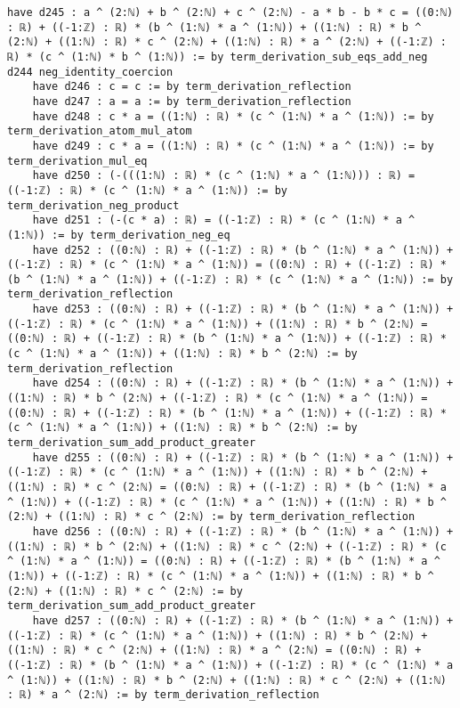 \documentclass{article}
\begin{document}
\begin{tcolorbox}[colback=white!10, width=\linewidth]
\begin{lstlisting}[language=Lean4]
    have d245 : a ^ (2:ℕ) + b ^ (2:ℕ) + c ^ (2:ℕ) - a * b - b * c = ((0:ℕ) : ℝ) + ((-1:ℤ) : ℝ) * (b ^ (1:ℕ) * a ^ (1:ℕ)) + ((1:ℕ) : ℝ) * b ^ (2:ℕ) + ((1:ℕ) : ℝ) * c ^ (2:ℕ) + ((1:ℕ) : ℝ) * a ^ (2:ℕ) + ((-1:ℤ) : ℝ) * (c ^ (1:ℕ) * b ^ (1:ℕ)) := by term_derivation_sub_eqs_add_neg d244 neg_identity_coercion
    have d246 : c = c := by term_derivation_reflection
    have d247 : a = a := by term_derivation_reflection
    have d248 : c * a = ((1:ℕ) : ℝ) * (c ^ (1:ℕ) * a ^ (1:ℕ)) := by term_derivation_atom_mul_atom
    have d249 : c * a = ((1:ℕ) : ℝ) * (c ^ (1:ℕ) * a ^ (1:ℕ)) := by term_derivation_mul_eq
    have d250 : (-(((1:ℕ) : ℝ) * (c ^ (1:ℕ) * a ^ (1:ℕ))) : ℝ) = ((-1:ℤ) : ℝ) * (c ^ (1:ℕ) * a ^ (1:ℕ)) := by term_derivation_neg_product
    have d251 : (-(c * a) : ℝ) = ((-1:ℤ) : ℝ) * (c ^ (1:ℕ) * a ^ (1:ℕ)) := by term_derivation_neg_eq
    have d252 : ((0:ℕ) : ℝ) + ((-1:ℤ) : ℝ) * (b ^ (1:ℕ) * a ^ (1:ℕ)) + ((-1:ℤ) : ℝ) * (c ^ (1:ℕ) * a ^ (1:ℕ)) = ((0:ℕ) : ℝ) + ((-1:ℤ) : ℝ) * (b ^ (1:ℕ) * a ^ (1:ℕ)) + ((-1:ℤ) : ℝ) * (c ^ (1:ℕ) * a ^ (1:ℕ)) := by term_derivation_reflection
    have d253 : ((0:ℕ) : ℝ) + ((-1:ℤ) : ℝ) * (b ^ (1:ℕ) * a ^ (1:ℕ)) + ((-1:ℤ) : ℝ) * (c ^ (1:ℕ) * a ^ (1:ℕ)) + ((1:ℕ) : ℝ) * b ^ (2:ℕ) = ((0:ℕ) : ℝ) + ((-1:ℤ) : ℝ) * (b ^ (1:ℕ) * a ^ (1:ℕ)) + ((-1:ℤ) : ℝ) * (c ^ (1:ℕ) * a ^ (1:ℕ)) + ((1:ℕ) : ℝ) * b ^ (2:ℕ) := by term_derivation_reflection
    have d254 : ((0:ℕ) : ℝ) + ((-1:ℤ) : ℝ) * (b ^ (1:ℕ) * a ^ (1:ℕ)) + ((1:ℕ) : ℝ) * b ^ (2:ℕ) + ((-1:ℤ) : ℝ) * (c ^ (1:ℕ) * a ^ (1:ℕ)) = ((0:ℕ) : ℝ) + ((-1:ℤ) : ℝ) * (b ^ (1:ℕ) * a ^ (1:ℕ)) + ((-1:ℤ) : ℝ) * (c ^ (1:ℕ) * a ^ (1:ℕ)) + ((1:ℕ) : ℝ) * b ^ (2:ℕ) := by term_derivation_sum_add_product_greater
    have d255 : ((0:ℕ) : ℝ) + ((-1:ℤ) : ℝ) * (b ^ (1:ℕ) * a ^ (1:ℕ)) + ((-1:ℤ) : ℝ) * (c ^ (1:ℕ) * a ^ (1:ℕ)) + ((1:ℕ) : ℝ) * b ^ (2:ℕ) + ((1:ℕ) : ℝ) * c ^ (2:ℕ) = ((0:ℕ) : ℝ) + ((-1:ℤ) : ℝ) * (b ^ (1:ℕ) * a ^ (1:ℕ)) + ((-1:ℤ) : ℝ) * (c ^ (1:ℕ) * a ^ (1:ℕ)) + ((1:ℕ) : ℝ) * b ^ (2:ℕ) + ((1:ℕ) : ℝ) * c ^ (2:ℕ) := by term_derivation_reflection
    have d256 : ((0:ℕ) : ℝ) + ((-1:ℤ) : ℝ) * (b ^ (1:ℕ) * a ^ (1:ℕ)) + ((1:ℕ) : ℝ) * b ^ (2:ℕ) + ((1:ℕ) : ℝ) * c ^ (2:ℕ) + ((-1:ℤ) : ℝ) * (c ^ (1:ℕ) * a ^ (1:ℕ)) = ((0:ℕ) : ℝ) + ((-1:ℤ) : ℝ) * (b ^ (1:ℕ) * a ^ (1:ℕ)) + ((-1:ℤ) : ℝ) * (c ^ (1:ℕ) * a ^ (1:ℕ)) + ((1:ℕ) : ℝ) * b ^ (2:ℕ) + ((1:ℕ) : ℝ) * c ^ (2:ℕ) := by term_derivation_sum_add_product_greater
    have d257 : ((0:ℕ) : ℝ) + ((-1:ℤ) : ℝ) * (b ^ (1:ℕ) * a ^ (1:ℕ)) + ((-1:ℤ) : ℝ) * (c ^ (1:ℕ) * a ^ (1:ℕ)) + ((1:ℕ) : ℝ) * b ^ (2:ℕ) + ((1:ℕ) : ℝ) * c ^ (2:ℕ) + ((1:ℕ) : ℝ) * a ^ (2:ℕ) = ((0:ℕ) : ℝ) + ((-1:ℤ) : ℝ) * (b ^ (1:ℕ) * a ^ (1:ℕ)) + ((-1:ℤ) : ℝ) * (c ^ (1:ℕ) * a ^ (1:ℕ)) + ((1:ℕ) : ℝ) * b ^ (2:ℕ) + ((1:ℕ) : ℝ) * c ^ (2:ℕ) + ((1:ℕ) : ℝ) * a ^ (2:ℕ) := by term_derivation_reflection

\end{lstlisting}
\end{tcolorbox}
\end{document}

